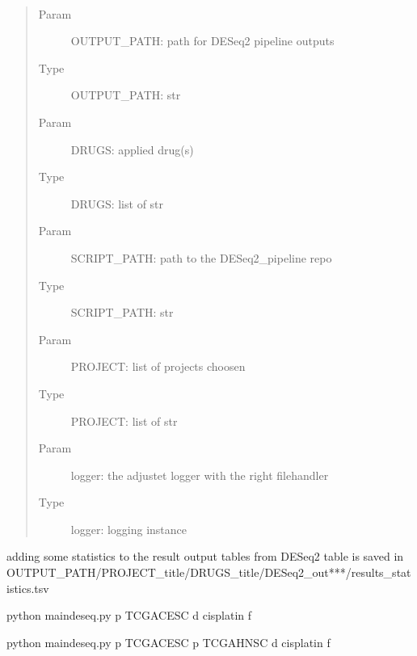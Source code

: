 \documentclass[letterpaper,10pt,english]{sphinxmanual}
\begin{document}
\begin{fulllineitems}
\label{\detokenize{index:create_matrix_new.create_statistics_from_DESeq2_tables}}~\begin{quote}\begin{description}
\item[{Param}] \leavevmode
\sphinxAtStartPar
OUTPUT\_PATH: path for DESeq2 pipeline outputs

\item[{Type}] \leavevmode
\sphinxAtStartPar
OUTPUT\_PATH: str

\item[{Param}] \leavevmode
\sphinxAtStartPar
DRUGS: applied drug(s)

\item[{Type}] \leavevmode
\sphinxAtStartPar
DRUGS: list of str

\item[{Param}] \leavevmode
\sphinxAtStartPar
SCRIPT\_PATH: path to the DESeq2\_pipeline repo

\item[{Type}] \leavevmode
\sphinxAtStartPar
SCRIPT\_PATH: str

\item[{Param}] \leavevmode
\sphinxAtStartPar
PROJECT: list of projects choosen

\item[{Type}] \leavevmode
\sphinxAtStartPar
PROJECT: list of str

\item[{Param}] \leavevmode
\sphinxAtStartPar
logger: the adjustet logger with the right filehandler

\item[{Type}] \leavevmode
\sphinxAtStartPar
logger: logging instance

\end{description}\end{quote}

\sphinxAtStartPar
adding some statistics to the result output tables from DESeq2
table is saved in
OUTPUT\_PATH/PROJECT\_title/DRUGS\_title/DESeq2\_out***/results\_statistics.tsv

\begin{sphinxVerbatim}[commandchars=\\\{\}]
\PYGZdl{} python main\PYGZus{}deseq.py \PYGZhy{}p TCGA\PYGZhy{}CESC \PYGZhy{}d cisplatin \PYGZhy{}f 

\PYGZdl{} python main\PYGZus{}deseq.py \PYGZhy{}p TCGA\PYGZhy{}CESC  \PYGZhy{}p TCGA\PYGZhy{}HNSC \PYGZhy{}d cisplatin \PYGZhy{}f 
\end{sphinxVerbatim}

\end{fulllineitems}
\end{document}

